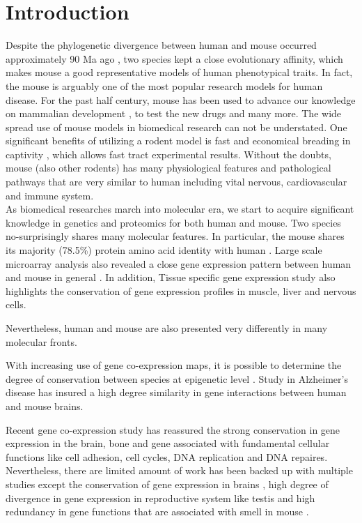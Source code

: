 \section{Introduction}

Despite the phylogenetic divergence between human and mouse occurred approximately 90 Ma ago \cite{Hedges_2006}, two species kept a close evolutionary affinity, which makes mouse a good representative models of human phenotypical traits. In fact, the mouse is arguably one of the most popular research models for human disease. For the past half century, mouse has been used to advance our knowledge on mammalian development \cite{Ueda_2006, Cheon_2011}, to test the new drugs \cite{Van_Dam_2011} and many more. The wide spread use of mouse models in biomedical research can not be understated. \cite{MORSEIII_2007} One significant benefits of utilizing a rodent model is fast and economical breading in captivity \cite{Rosenthal_2007}, which allows fast tract experimental results. \cite{Vandamme_2014} Without the doubts, mouse (also other rodents) has many physiological features and pathological pathways that are very similar to human including vital nervous, cardiovascular and immune system. \cite{MORSEIII_2007,Rosenthal_2007} \\

As biomedical researches march into molecular era, we start to acquire significant knowledge in genetics and proteomics for both human and mouse. Two species no-surprisingly shares many molecular features. In particular, the mouse shares its majority (78.5\%) protein amino acid identity with human \cite{Lindblad_Toh_2001}. Large scale microarray analysis also revealed a close gene expression pattern between human and mouse in general \cite{Liao_2005}. In addition, Tissue specific gene expression study \cite{Zheng_Bradley_2010} also highlights the conservation of gene expression profiles in muscle, liver and nervous cells. 

Nevertheless, human and mouse are also presented very differently in many molecular fronts. 

With increasing use of gene co-expression maps, it is possible to determine the degree of conservation between species at epigenetic level \cite{Stuart_2003,Oldham_2006}. Study in Alzheimer's disease \cite{Miller_2010} has insured a high degree similarity in gene interactions between human and mouse brains. 

Recent gene co-expression study \cite{Monaco_2015} has reassured the strong conservation in gene expression in the brain, bone and gene associated with fundamental cellular functions like cell adhesion, cell cycles, DNA replication and DNA repaires. \cite{Monaco_2015} Nevertheless, there are limited amount of work has been backed up with multiple studies except the conservation of gene expression in brains \cite{Liao_2005, Miller_2010, Chan_2009}, high degree of divergence in gene expression in reproductive system like testis \cite{Chan_2009, Brawand_2011, Necsulea_2014} and high redundancy in gene functions that are associated with smell in mouse \cite{Gilad_2009, Gilad_2003, Young_2002}. 
\\

